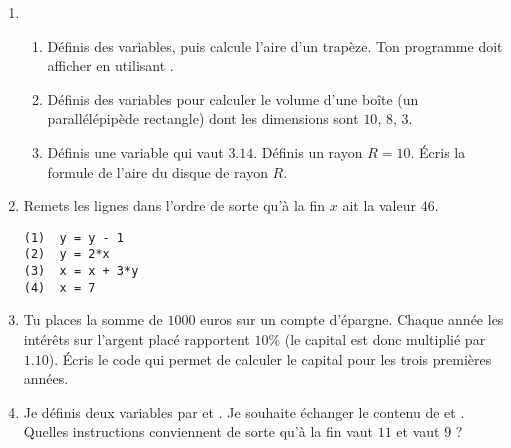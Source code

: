 \documentclass[11pt,class=report,crop=false]{standalone}
\begin{document}

\begin{activite}[Variables]


\begin{enumerate}
  \item 
  \begin{enumerate}
    \item   Définis des variables, puis calcule l'aire d'un trapèze. 
  Ton programme doit afficher  en utilisant .


    
    \item Définis des variables pour calculer le volume d'une boîte (un parallélépipède rectangle) dont les dimensions sont $10$, $8$, $3$.
    
    \item Définis une variable  qui vaut $3.14$. Définis un rayon $R = 10$. Écris la formule de l'aire du disque de rayon $R$.

\end{enumerate}    

  
  \item Remets les lignes dans l'ordre de sorte qu'à la fin $x$ ait la valeur $46$.
\begin{center}
\begin{minipage}{0.5\textwidth}
\begin{lstlisting}  
(1)  y = y - 1
(2)  y = 2*x
(3)  x = x + 3*y     
(4)  x = 7
\end{lstlisting}
\end{minipage}
\end{center}  
  
  \item Tu places la somme de $1000$ euros sur un compte d'épargne. Chaque année les intérêts sur l'argent placé rapportent $10\%$ (le capital est donc multiplié par $1.10$).
  Écris le code qui permet de calculer le capital pour les trois premières années.


  \item Je définis deux variables par  et . Je souhaite échanger le contenu de  et . Quelles instructions conviennent de sorte qu'à la fin  vaut $11$ et  vaut $9$ ?
  

\end{enumerate}
\end{activite}
\end{document}
